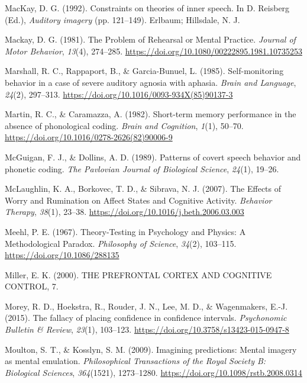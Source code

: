 \documentclass[a4paper,12pt,twoside,openright,oldfontcommands]{memoir}
\begin{document}
\hypertarget{ref-mackay_constraints_1992}{}
MacKay, D. G. (1992). Constraints on theories of inner speech. In D.
Reisberg (Ed.), \emph{Auditory imagery} (pp. 121--149). Erlbaum;
Hillsdale, N. J.

\hypertarget{ref-mackay_problem_1981}{}
Mackay, D. G. (1981). The Problem of Rehearsal or Mental Practice.
\emph{Journal of Motor Behavior}, \emph{13}(4), 274--285.
\url{https://doi.org/10.1080/00222895.1981.10735253}

\hypertarget{ref-marshall_self-monitoring_1985}{}
Marshall, R. C., Rappaport, B., \& Garcia-Bunuel, L. (1985).
Self-monitoring behavior in a case of severe auditory agnosia with
aphasia. \emph{Brain and Language}, \emph{24}(2), 297--313.
\url{https://doi.org/10.1016/0093-934X(85)90137-3}

\hypertarget{ref-martin_short-term_1982}{}
Martin, R. C., \& Caramazza, A. (1982). Short-term memory performance in
the absence of phonological coding. \emph{Brain and Cognition},
\emph{1}(1), 50--70. \url{https://doi.org/10.1016/0278-2626(82)90006-9}

\hypertarget{ref-mcguigan_patterns_1989}{}
McGuigan, F. J., \& Dollins, A. D. (1989). Patterns of covert speech
behavior and phonetic coding. \emph{The Pavlovian Journal of Biological
Science}, \emph{24}(1), 19--26.

\hypertarget{ref-mclaughlin_effects_2007}{}
McLaughlin, K. A., Borkovec, T. D., \& Sibrava, N. J. (2007). The
Effects of Worry and Rumination on Affect States and Cognitive Activity.
\emph{Behavior Therapy}, \emph{38}(1), 23--38.
\url{https://doi.org/10.1016/j.beth.2006.03.003}

\hypertarget{ref-meehl_theory-testing_1967}{}
Meehl, P. E. (1967). Theory-Testing in Psychology and Physics: A
Methodological Paradox. \emph{Philosophy of Science}, \emph{34}(2),
103--115. \url{https://doi.org/10.1086/288135}

\hypertarget{ref-miller_prefrontal_2000}{}
Miller, E. K. (2000). THE PREFRONTAL CORTEX AND COGNITIVE CONTROL, 7.

\hypertarget{ref-morey_fallacy_2015}{}
Morey, R. D., Hoekstra, R., Rouder, J. N., Lee, M. D., \& Wagenmakers,
E.-J. (2015). The fallacy of placing confidence in confidence intervals.
\emph{Psychonomic Bulletin \& Review}, \emph{23}(1), 103--123.
\url{https://doi.org/10.3758/s13423-015-0947-8}

\hypertarget{ref-moulton_imagining_2009}{}
Moulton, S. T., \& Kosslyn, S. M. (2009). Imagining predictions: Mental
imagery as mental emulation. \emph{Philosophical Transactions of the
Royal Society B: Biological Sciences}, \emph{364}(1521), 1273--1280.
\url{https://doi.org/10.1098/rstb.2008.0314}
\end{document}
